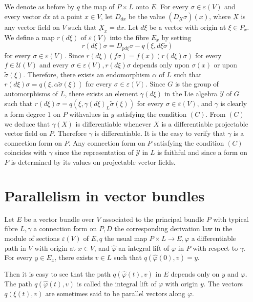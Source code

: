 We denote as before by $q$ the map of $P \times L$ onto $E$. For every
$\sigma \in \varepsilon (V)$ and every vector $dx$ at a point $x \in
V$, let $D_{dx}$ be the value $(D_{\underbar{X}} \sigma) (x)$, where
$\underbar{X}$ is any vector field on $V$ such that $\underbar{X}_x =
dx$. Let $d \xi$ be a vector with origin at $\xi \in P_x$. We define a
map $r (d \xi)$ of $\varepsilon (V)$ into the fibre $E_x$ by setting 
$$
r(d \xi) \sigma = D_{pd \xi} \sigma - q (\xi , d \xi \tilde{\sigma})
$$
for every $\sigma \in \varepsilon (V)$. Since $r(d \xi) (f \sigma) =
f(x) (r(d \xi) \sigma)$ for every $f \in \mathscr{U}(V)$ and every
$\sigma \in \varepsilon (V) , r (d \xi) \sigma$ depends only upon
$\sigma (x)$ or upon $\tilde{\sigma} (\xi)$. Therefore, there exists
an endomorphism $\alpha$ of $L$ such that $r(d \xi) \sigma = q (\xi ,
\alpha \tilde{\sigma}(\xi))$ for every $\sigma \in \varepsilon
(V)$. Since $G$ is the group of automorphisms of $L$, there exists an
element $\gamma (d \xi)$ in the Lie algebra $\mathscr{Y}$ of $G$ such
that $r(d \xi) \sigma = q (\xi ,\gamma (d \xi)_L \tilde{\sigma}(\xi))$
for every $\sigma \in \varepsilon (V)$, and $\gamma$ is clearly a form
degree $1$ on $P$ with\pageoriginale values in $y$ satisfying the condition $(C)$. From
$(C)$ we deduce that $\gamma(X)$ is differentiable whenever $X$ is a
differentiable projectable vector field on $P$. Therefore $\gamma$ is
differentiable. It is the easy to verify that $\gamma$ is a connection
form on $P$. Any connection form on $P$ satisfying the condition $(C)$
coincides with $\gamma$ since the representation of $\mathscr{Y}$ in
$L$ is faithful and since a form on $P$ is determined by its values on
projectable vector fields. 

\section{Parallelism in vector bundles}\label{chap5:sec7}%

Let $E$ be a vector bundle over $V$ associated to the principal bundle
$P$ with typical fibre $L, \gamma$ a connection form on $P, D$ the
corresponding derivation law in the module of sections $\varepsilon (V)$
of $E, q$ the usual map $P \times L \to E , \varphi$ a differentiable
path in $V$ with origin at $x \in V$, and $\hat{\varphi}$ an integral
lift of $\varphi$ in $P$ with respect to $\gamma$. For every $y \in
E_x$, there exists $v \in L $ such that $q (\hat{\varphi}(0), v) =
y$. 

Then it is easy to see that the path $q(\hat{\varphi}(t), v)$ in $E$
depends only on $y$ and $\varphi$. The path $q(\hat{\varphi}(t), v)$
is called the integral lift of $\varphi$ with origin $y$. The vectors
$q(\xi (t), v)$ are sometimes said to be parallel vectors along
$\varphi$. 

